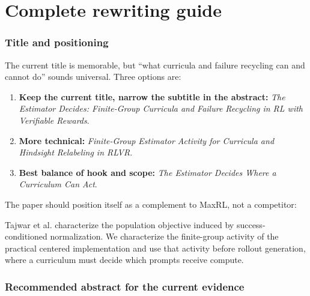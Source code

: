 \documentclass[11pt]{article}
\theoremstyle{definition}
\theoremstyle{remark}
\begin{document}
\part{Complete rewriting guide}

\section{Title and positioning}

The current title is memorable, but ``what curricula and failure recycling can and cannot do'' sounds universal. Three options are:

\begin{enumerate}[leftmargin=2em]
\item \textbf{Keep the current title, narrow the subtitle in the abstract:} \emph{The Estimator Decides: Finite-Group Curricula and Failure Recycling in RL with Verifiable Rewards}.
\item \textbf{More technical:} \emph{Finite-Group Estimator Activity for Curricula and Hindsight Relabeling in RLVR}.
\item \textbf{Best balance of hook and scope:} \emph{The Estimator Decides Where a Curriculum Can Act}.
\end{enumerate}

The paper should position itself as a complement to MaxRL, not a competitor:

\begin{rewritebox}
Tajwar et al. characterize the population objective induced by success-conditioned normalization. We characterize the finite-group activity of the practical centered implementation and use that activity before rollout generation, where a curriculum must decide which prompts receive compute.
\end{rewritebox}

\section{Recommended abstract for the current evidence}
\end{document}
